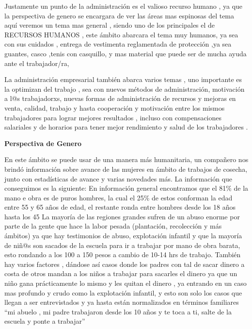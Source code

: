 \documentclass[12pt]{article}
\begin{document}
{{{{{{{			Justamente un punto de la administración es el valioso recurso humano , ya que la perspectiva de genero se encargara de ver las áreas mas espinosas del tema aquí veremos un tema mas general , siendo uno de los principales el de RECURSOS HUMANOS , este ámbito abarcara el tema muy humanos, ya sea con sus cuidados , entrega de vestimenta reglamentada de protección ,ya sea guantes, casco ,tenis con casquillo, y mas material que puede ser de mucha ayuda ante el trabajador/ra,
			
			La administración empresarial también abarca varios temas , uno importante es la optimizan del trabajo , sea con nuevos métodos de administración, motivación a l@s trabajadorxs, nuevas formas de administración de recursos y mejoras en venta, calidad, trabajo y hasta cooperación y motivación entre los mismos trabajadores para lograr mejores resultados , incluso con compensaciones salariales y de horarios para tener mejor rendimiento y salud de los trabajadores . 
			
		\newpage
	\begin{center}
		{\huge \textbf{Perspectiva de Genero}}
	\end{center}
	\vspace{1cm} 
	{\large %
			En este ámbito se puede usar de una manera más humanitaria, un compañero nos brindó información sobre avance de las mujeres en ámbito de trabajos de cosecha, junto con estadísticas de avance y varias novedades más.
			La información que conseguimos es la siguiente:
			En información general encontramos que el 81\% de la mano e obra es de puros hombres, la cual el 25\% de estos conforman la edad entre 55 y 65 años de edad, el restante ronda entre hombres desde los 18 años hasta los 45
			La mayoría de las regiones grandes sufren de un abuso enorme por parte de la gente que hace la labor pesada (plantación, recolección y más ámbitos) ya que hay testimonios de abuso, explotación infantil y que la mayoría de niñ@s son sacados de la escuela para ir a trabajar por mano de obra barata, esto rondando a los 100 a 150 pesos a cambio de 10-14 hrs de trabajo.
			También hay varios factores , dándose así casos donde los padres con tal de sacar dinero a costa de otros mandan a los niños a trabajar para sacarles el dinero ya que un niño gana prácticamente lo mismo y les quitan el dinero , ya entrando en un caso mas profundo y crudo como la explotación infantil, y esto son solo los casos que llegan a ser entrevistados y ya hasta están normalizados en términos familiares “mi abuelo , mi padre trabajaron desde los 10 años y te toca a ti, salte de la escuela y ponte a trabajar” 
			
}}}}}}}}
\end{document}

